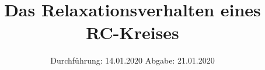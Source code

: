 

\subject{Versuch Nr. 353}
\title{Das Relaxationsverhalten eines RC-Kreises}
\date{%
  Durchführung: 14.01.2020
  \hspace{3em}
  Abgabe: 21.01.2020
}


\setlength{\parindent}{0pt} %

\maketitle
\thispagestyle{empty}
\tableofcontents
\newpage



%




\printbibliography{}


